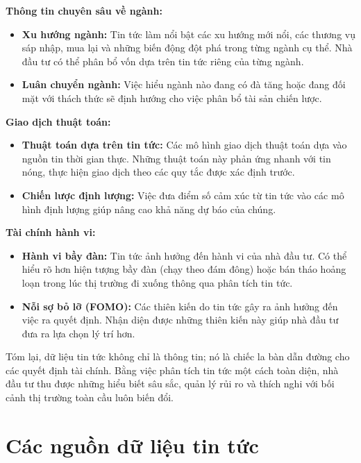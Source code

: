 \textbf{Thông tin chuyên sâu về ngành:}

\begin{itemize}
\item
  \textbf{Xu hướng ngành:} Tin tức làm nổi bật các xu hướng mới nổi, các thương vụ sáp nhập, mua lại và những biến động đột phá trong từng ngành cụ thể. Nhà đầu tư có thể phân bổ vốn dựa trên tin tức riêng của từng ngành.
\item
  \textbf{Luân chuyển ngành:} Việc hiểu ngành nào đang có đà tăng hoặc đang đối mặt với thách thức sẽ định hướng cho việc phân bổ tài sản chiến lược.
\end{itemize}

\textbf{Giao dịch thuật toán:}

\begin{itemize}
\item
  \textbf{Thuật toán dựa trên tin tức:} Các mô hình giao dịch thuật toán dựa vào nguồn tin thời gian thực. Những thuật toán này phản ứng nhanh với tin nóng, thực hiện giao dịch theo các quy tắc được xác định trước.
\item
  \textbf{Chiến lược định lượng:} Việc đưa điểm số cảm xúc từ tin tức vào các mô hình định lượng giúp nâng cao khả năng dự báo của chúng.
\end{itemize}

\textbf{Tài chính hành vi:}

\begin{itemize}
\item
  \textbf{Hành vi bầy đàn:} Tin tức ảnh hưởng đến hành vi của nhà đầu tư. Có thể hiểu rõ hơn hiện tượng bầy đàn (chạy theo đám đông) hoặc bán tháo hoảng loạn trong lúc thị trường đi xuống thông qua phân tích tin tức.
\item
  \textbf{Nỗi sợ bỏ lỡ (FOMO):} Các thiên kiến do tin tức gây ra ảnh hưởng đến việc ra quyết định. Nhận diện được những thiên kiến này giúp nhà đầu tư đưa ra lựa chọn lý trí hơn.
\end{itemize}

Tóm lại, dữ liệu tin tức không chỉ là thông tin; nó là chiếc la bàn dẫn đường cho các quyết định tài chính. Bằng việc phân tích tin tức một cách toàn diện, nhà đầu tư thu được những hiểu biết sâu sắc, quản lý rủi ro và thích nghi với bối cảnh thị trường toàn cầu luôn biến đổi.

\section{Các nguồn dữ liệu tin tức}

